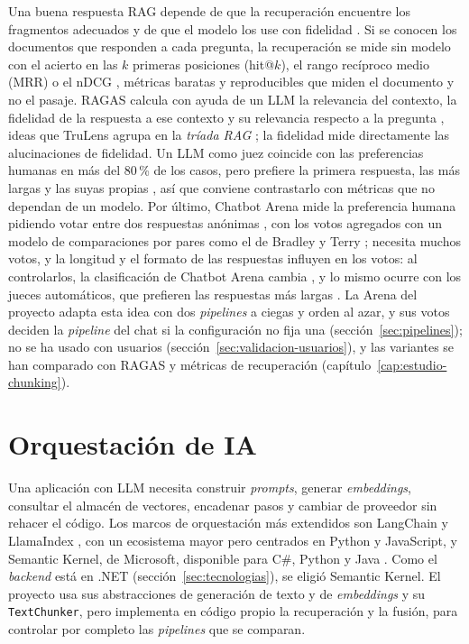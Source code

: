 Una buena respuesta RAG depende de que la recuperación encuentre los fragmentos adecuados y de que el modelo los use con fidelidad \cite{yu2024ragsurvey}. Si se conocen los documentos que responden a cada pregunta, la recuperación se mide sin modelo con el acierto en las $k$ primeras posiciones (hit@$k$), el rango recíproco medio (MRR) \cite{voorhees1999trec} o el nDCG \cite{jarvelin2002ndcg}, métricas baratas y reproducibles que miden el documento y no el pasaje. RAGAS calcula con ayuda de un LLM la relevancia del contexto, la fidelidad de la respuesta a ese contexto y su relevancia respecto a la pregunta \cite{es2023ragas}, ideas que TruLens agrupa en la \emph{tríada RAG} \cite{trulens}; la fidelidad mide directamente las alucinaciones de fidelidad. Un LLM como juez coincide con las preferencias humanas en más del 80\,\% de los casos, pero prefiere la primera respuesta, las más largas y las suyas propias \cite{zheng2023judge,panickssery2024self}, así que conviene contrastarlo con métricas que no dependan de un modelo. Por último, Chatbot Arena mide la preferencia humana pidiendo votar entre dos respuestas anónimas \cite{chiang2024}, con los votos agregados con un modelo de comparaciones por pares como el de Bradley y Terry \cite{bradley1952}; necesita muchos votos, y la longitud y el formato de las respuestas influyen en los votos: al controlarlos, la clasificación de Chatbot Arena cambia \cite{li2024stylecontrol}, y lo mismo ocurre con los jueces automáticos, que prefieren las respuestas más largas \cite{dubois2024lcalpaca}.
La Arena del proyecto adapta esta idea con dos \emph{pipelines} a ciegas y orden al azar, y sus votos deciden la \emph{pipeline} del chat si la configuración no fija una (sección~\ref{sec:pipelines}); no se ha usado con usuarios (sección~\ref{sec:validacion-usuarios}), y las variantes se han comparado con RAGAS y métricas de recuperación (capítulo~\ref{cap:estudio-chunking}).

\section{Orquestación de IA}
\label{sec:orquestacion}

Una aplicación con LLM necesita construir \emph{prompts}, generar \emph{embeddings}, consultar el almacén de vectores, encadenar pasos y cambiar de proveedor sin rehacer el código. Los marcos de orquestación más extendidos son LangChain \cite{langchain} y LlamaIndex \cite{llamaindex}, con un ecosistema mayor pero centrados en Python y JavaScript, y Semantic Kernel, de Microsoft, disponible para C\#, Python y Java \cite{semantickernel}. Como el \emph{backend} está en .NET (sección~\ref{sec:tecnologias}), se eligió Semantic Kernel. El proyecto usa sus abstracciones de generación de texto y de \emph{embeddings} y su \texttt{TextChunker}, pero implementa en código propio la recuperación y la fusión, para controlar por completo las \emph{pipelines} que se comparan.


